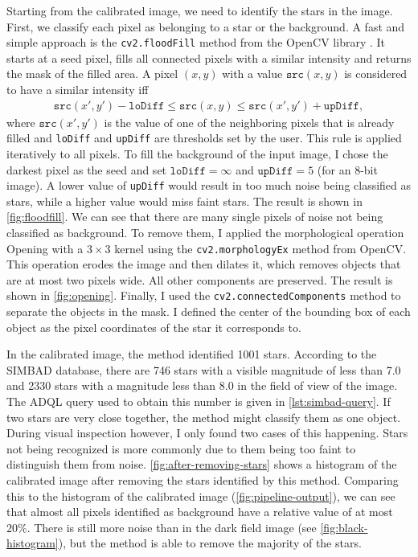 Starting from the calibrated image, we need to identify the stars in the image. First,
we classify each pixel as belonging to a star or the background. A fast and simple
approach is the \texttt{cv2.floodFill} method from the OpenCV library \cite{opencv2000}.
It starts at a seed pixel, fills all connected pixels with a similar intensity and returns
the mask of the filled area. A pixel $(x, y)$ with a value $\texttt{src}(x, y)$ is
considered to have a similar intensity iff
\begin{align*}
  \texttt{src}(x', y') - \texttt{loDiff} \leq \texttt{src}(x, y) \leq \texttt{src}(x', y') + \texttt{upDiff},
\end{align*}
where $\texttt{src}(x', y')$ is the value of one of the neighboring pixels that is already
filled and \texttt{loDiff} and \texttt{upDiff} are thresholds set by the user. This rule
is applied iteratively to all pixels. To fill the background of the input image, I
chose the darkest pixel as the seed and set $\texttt{loDiff} = \infty$ and
$\texttt{upDiff} = 5$ (for an 8-bit image). A lower value of \texttt{upDiff} would result
in too much noise being classified as stars, while a higher value would miss faint stars.
The result is shown in \autoref{fig:floodfill}. We can see that there are many single
pixels of noise not being classified as background. To remove them, I applied the
morphological operation Opening with a $3 \times 3$ kernel using the
\texttt{cv2.morphologyEx} method from OpenCV. This operation erodes the image and then
dilates it, which removes objects that are at most two pixels wide. All other components
are preserved. The result is shown in \autoref{fig:opening}. Finally, I used the
\texttt{cv2.connectedComponents} method to separate the objects in the mask. I defined the
center of the bounding box of each object as the pixel coordinates of the star it
corresponds to.

In the calibrated image, the method identified 1001 stars. According to the SIMBAD
database, there are 746 stars with a visible magnitude of less than 7.0 and 2330 stars
with a magnitude less than 8.0 in the field of view of the image. The ADQL query used to
obtain this number is given in \autoref{lst:simbad-query}. If two stars are very close
together, the method might classify them as one object. During visual inspection however,
I only found two cases of this happening. Stars not being recognized is more commonly due
to them being too faint to distinguish them from noise. \autoref{fig:after-removing-stars}
shows a histogram of the calibrated image after removing the stars identified by this
method. Comparing this to the histogram of the calibrated image
(\autoref{fig:pipeline-output}), we can see that almost all pixels identified as
background have a relative value of at most $20\%$. There is still more noise than in the
dark field image (see \autoref{fig:black-histogram}), but the method is able to remove
the majority of the stars.

